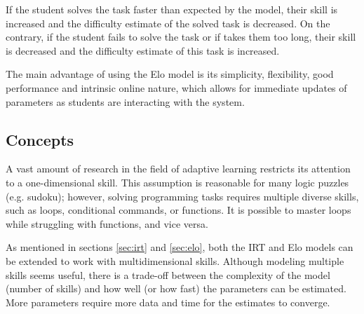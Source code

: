 If the student solves the task faster than expected by the model,
  their skill is increased and the difficulty estimate of the solved task is decreased.
On the contrary, if the student fails to solve the task or if takes them too long,
  their skill is decreased and the difficulty estimate of this task is increased.


The main advantage of using the Elo model is its simplicity, flexibility,
  good performance and intrinsic online nature, which allows for immediate
  updates of parameters as students are interacting with the system.



\subsection{Concepts}


A vast amount of research in the field of adaptive learning
  restricts its attention to a one-dimensional skill.
This assumption is reasonable for many logic puzzles (e.g. sudoku);
however, solving programming tasks requires multiple diverse skills,
  such as loops, conditional commands, or functions.
It is possible to master loops while struggling with functions,
  and vice versa.

As mentioned in sections \ref{sec:irt} and \ref{sec:elo},
  both the IRT and Elo models can be extended to work with multidimensional skills.
Although modeling multiple skills seems useful,
  there is a trade-off between the complexity of the model (number of skills)
  and how well (or how fast) the parameters can be estimated.
More parameters require more data and time for the estimates to converge.



